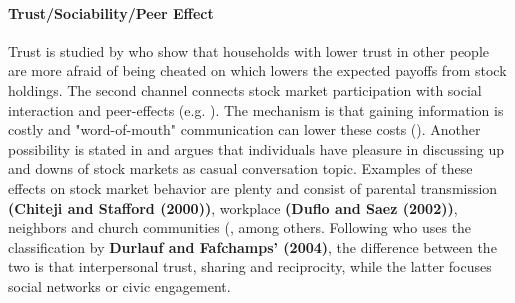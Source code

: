 \documentclass[ProjectABM]{subfiles}
\begin{document}





\paragraph{Trust/Sociability/Peer Effect}
Trust is studied by \cite{guiso_et_al_2008trusting} who show that households with lower trust in other people are more afraid of being cheated on which lowers the expected payoffs from stock holdings.
The second channel connects stock market participation with social interaction and peer-effects (e.g. \cite{georgarakos_pasini_2011, brown_2008, hong_et_al_2004social}). The mechanism is that gaining information is costly and "word-of-mouth" communication can lower these costs (\cite{brown_2008}). Another possibility is stated in \cite{hong_et_al_2004social} and argues that individuals have pleasure in discussing up and downs of stock markets as casual conversation topic. Examples of these effects on stock market behavior are plenty and consist of parental transmission \textbf{(Chiteji and Stafford (2000))}, workplace \textbf{(Duflo and Saez (2002))}, neighbors and church communities (\cite{hong_et_al_2004social, brown_2008}, among others.
Following \cite{georgarakos_pasini_2011} who uses the classification by \textbf{Durlauf and Fafchamps' (2004)}, the difference between the two is that interpersonal trust, sharing and reciprocity, while the latter focuses social networks or civic engagement.
\end{document}
